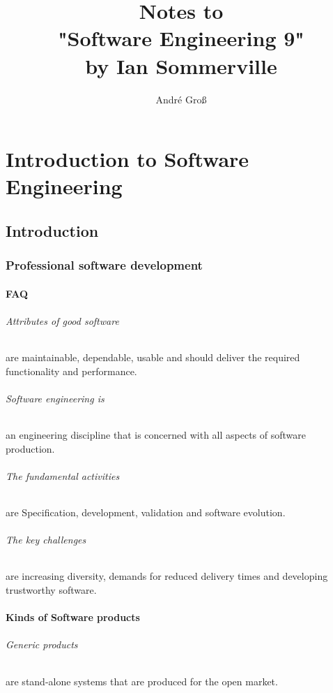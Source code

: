 \documentclass[a4paper,11pt,twocolumn]{report}
\title{Notes to\\"Software Engineering 9"\\by Ian Sommerville}
\author{André Groß}
\begin{document}
    \maketitle
    \tableofcontents
    \part[Introduction]{Introduction to Software Engineering}
    \chapter{Introduction}
    \section{Professional software development}
    \subsection{FAQ}
    \paragraph{Attributes of good software}
    are maintainable, dependable, usable and should deliver the required 
    functionality and performance.
    \paragraph{Software engineering is}
    an engineering discipline that is concerned with all aspects of software 
    production.
    \paragraph{The fundamental activities}
    are Specification, development, validation and software evolution.
    \paragraph{The key challenges}
    are increasing diversity, demands for reduced delivery times and developing
    trustworthy software.
    \subsection{Kinds of Software products}
    \paragraph{Generic products}
    are stand-alone systems that are produced for the open market.
\end{document}
